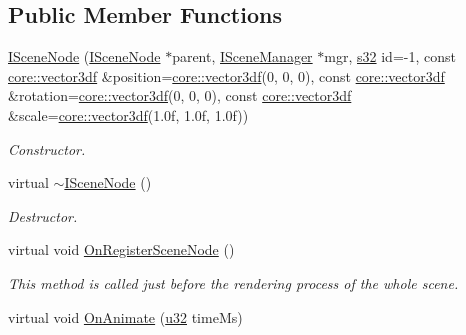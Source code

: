 \subsection*{Public Member Functions}
\begin{DoxyCompactItemize}
\item 
\mbox{\label{classirr_1_1scene_1_1ISceneNode_a9894d951df2f720924f891e0a7b9fac2}} 
\hyperlink{classirr_1_1scene_1_1ISceneNode_a9894d951df2f720924f891e0a7b9fac2}{I\+Scene\+Node} (\hyperlink{classirr_1_1scene_1_1ISceneNode}{I\+Scene\+Node} $\ast$parent, \hyperlink{classirr_1_1scene_1_1ISceneManager}{I\+Scene\+Manager} $\ast$mgr, \hyperlink{namespaceirr_ac66849b7a6ed16e30ebede579f9b47c6}{s32} id=-\/1, const \hyperlink{namespaceirr_1_1core_ae6e2b2a6c552833ebbd5b7463d03586b}{core\+::vector3df} \&position=\hyperlink{namespaceirr_1_1core_ae6e2b2a6c552833ebbd5b7463d03586b}{core\+::vector3df}(0, 0, 0), const \hyperlink{namespaceirr_1_1core_ae6e2b2a6c552833ebbd5b7463d03586b}{core\+::vector3df} \&rotation=\hyperlink{namespaceirr_1_1core_ae6e2b2a6c552833ebbd5b7463d03586b}{core\+::vector3df}(0, 0, 0), const \hyperlink{namespaceirr_1_1core_ae6e2b2a6c552833ebbd5b7463d03586b}{core\+::vector3df} \&scale=\hyperlink{namespaceirr_1_1core_ae6e2b2a6c552833ebbd5b7463d03586b}{core\+::vector3df}(1.\+0f, 1.\+0f, 1.\+0f))
\begin{DoxyCompactList}\small\item\em Constructor. \end{DoxyCompactList}\item 
\mbox{\label{classirr_1_1scene_1_1ISceneNode_a3064ed436d731f072e55873577724fbc}} 
virtual \hyperlink{classirr_1_1scene_1_1ISceneNode_a3064ed436d731f072e55873577724fbc}{$\sim$\+I\+Scene\+Node} ()
\begin{DoxyCompactList}\small\item\em Destructor. \end{DoxyCompactList}\item 
virtual void \hyperlink{classirr_1_1scene_1_1ISceneNode_ac9795bfcb88dcaf8cba6ea3296e5d8d0}{On\+Register\+Scene\+Node} ()
\begin{DoxyCompactList}\small\item\em This method is called just before the rendering process of the whole scene. \end{DoxyCompactList}\item 
virtual void \hyperlink{classirr_1_1scene_1_1ISceneNode_afc1dcb5cb19116d0c7aa3d4ebdf04cc5}{On\+Animate} (\hyperlink{namespaceirr_a0416a53257075833e7002efd0a18e804}{u32} time\+Ms)

\end{DoxyCompactItemize}
